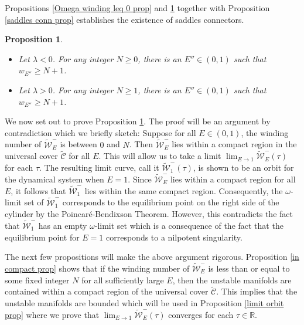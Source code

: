 \documentclass[11 pt]{article}
\newtheorem{prop}[thm]{Proposition}%
\renewcommand\l{\lambda}
\renewcommand\({\left(}
\renewcommand\){\right)}
\newcommand\wt{\widetilde}
\newcommand\<{\langle}
\renewcommand\>{\rangle}
\renewcommand\l{\lambda}
\newcommand\8{\infty}
\newcommand{\R}{\mathbb R}
\newcommand{\mc}{\mathcal}
\begin{document}
\medskip
\medskip

Propositions \ref{Omega winding leq 0 prop} and \ref{Omega wind geq n + 1 prop} together with Proposition \ref{saddles conn prop} establishes the existence of saddles connectors. 


\medskip
\medskip

\begin{prop}\label{Omega wind geq n + 1 prop}\: $\phantom{nix}$
\begin{itemize}
\item[$\bullet$] Let $\l < 0$. For any integer $N \geq 0$, there is an $E'' \in (0,1)$ such that $w_{E''} \geq N+1$. 
\item[$\bullet$] Let $\l > 0$. For any integer $N \geq 1$, there is an $E'' \in (0,1)$ such that $w_{E''} \geq N+1$. 
\end{itemize}
\end{prop}

\medskip
\medskip


We now set out to prove Proposition \ref{Omega wind geq n + 1 prop}. The proof will be an argument by contradiction which we briefly sketch: Suppose for all $E \in (0,1)$, the winding number of $\wt{\mc{W}}^-_E$ is between $0$ and $N$. Then $\wt{\mc{W}}^-_E$ lies within a compact region in the universal cover $\wt{\mc{C}}$ for all $E$. This will allow us to take a limit $\lim_{E \to 1}\wt{\mc{W}}^-_E(\tau)$ for each $\tau$. The resulting limit curve, call it $\wt{\mc{W}}^-_1(\tau)$, is shown to be an orbit for the dynamical system when $E = 1$. Since $\wt{\mc{W}}^-_E$ lies within a compact region for all $E$, it follows that $\wt{\mc{W}}^-_1$ lies within the same compact region. Consequently, the $\omega$-limit set of $\wt{\mc{W}}^-_1$ corresponds to the equilibrium point on the right side of the cylinder by the Poincar{\'e}-Bendixson Theorem. However, this contradicts the fact that $\wt{\mc{W}}^-_1$ has an empty $\omega$-limit set which is a consequence of the fact that the equilibrium point for $E = 1$ corresponds to a nilpotent singularity. 


The next few propositions will make the above argument rigorous. Proposition \ref{in compact prop} shows that if the winding number of $\wt{\mc{W}}_E^-$ is less than or equal to some fixed integer $N$ for all sufficiently large $E$, then the unstable manifolds are contained within a compact region of the universal cover $\wt{\mc{C}}$. This implies that the unstable manifolds are bounded which will be used in Proposition \ref{limit orbit prop} where we prove that $\lim_{E \to 1}\wt{\mc{W}}_E^-(\tau)$ converges for each $\tau \in \R$. 
\end{document}
